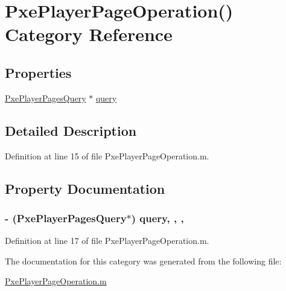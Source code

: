 \hypertarget{category_pxe_player_page_operation_07_08}{\section{Pxe\-Player\-Page\-Operation() Category Reference}
\label{category_pxe_player_page_operation_07_08}
}
\subsection*{Properties}
\begin{DoxyCompactItemize}
\item 
\hyperlink{interface_pxe_player_pages_query}{Pxe\-Player\-Pages\-Query} $\ast$ \hyperlink{category_pxe_player_page_operation_07_08_a2a52e887869b9d4978e059b18896eb3c}{query}
\end{DoxyCompactItemize}


\subsection{Detailed Description}


Definition at line 15 of file Pxe\-Player\-Page\-Operation.\-m.



\subsection{Property Documentation}
\hypertarget{category_pxe_player_page_operation_07_08_a2a52e887869b9d4978e059b18896eb3c}{
\subsubsection[{query}]{\setlength{\rightskip}{0pt plus 5cm}-\/ ({\bf Pxe\-Player\-Pages\-Query}$\ast$) query\hspace{0.3cm}{\ttfamily [read]}, {\ttfamily [write]}, {\ttfamily [nonatomic]}, {\ttfamily [strong]}}}\label{category_pxe_player_page_operation_07_08_a2a52e887869b9d4978e059b18896eb3c}


Definition at line 17 of file Pxe\-Player\-Page\-Operation.\-m.



The documentation for this category was generated from the following file\-:\begin{DoxyCompactItemize}
\item 
\hyperlink{_pxe_player_page_operation_8m}{Pxe\-Player\-Page\-Operation.\-m}\end{DoxyCompactItemize}
